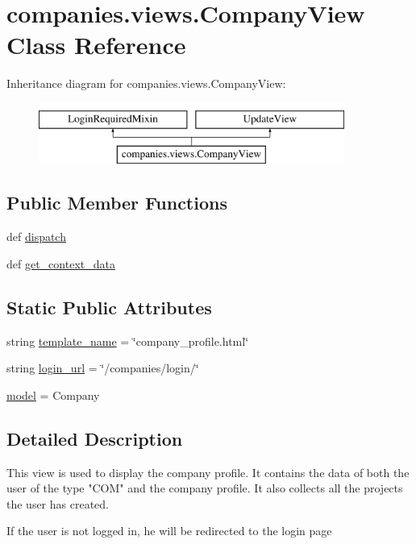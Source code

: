 \hypertarget{classcompanies_1_1views_1_1_company_view}{\section{companies.\-views.\-Company\-View Class Reference}
\label{classcompanies_1_1views_1_1_company_view}
}
Inheritance diagram for companies.\-views.\-Company\-View\-:\begin{figure}[H]
\begin{center}
\leavevmode
\includegraphics[height=2.000000cm]{classcompanies_1_1views_1_1_company_view}
\end{center}
\end{figure}
\subsection*{Public Member Functions}
\begin{DoxyCompactItemize}
\item 
def \hyperlink{classcompanies_1_1views_1_1_company_view_aaa790c7d15765cbc91d995fee5607041}{dispatch}
\item 
def \hyperlink{classcompanies_1_1views_1_1_company_view_a9bfc8f5e9d4cbfe993bac9298702ea8f}{get\-\_\-context\-\_\-data}
\end{DoxyCompactItemize}
\subsection*{Static Public Attributes}
\begin{DoxyCompactItemize}
\item 
string \hyperlink{classcompanies_1_1views_1_1_company_view_ac643f3eda9528b8985b7d9f2308f9c18}{template\-\_\-name} = \char`\"{}company\-\_\-profile.\-html\char`\"{}
\item 
string \hyperlink{classcompanies_1_1views_1_1_company_view_a67a131b471d1f3d6e1748eadfb41812f}{login\-\_\-url} = \char`\"{}/companies/login/\char`\"{}
\item 
\hyperlink{classcompanies_1_1views_1_1_company_view_a3e9e25180bcbb4b0f69f6a40a937d553}{model} = Company
\end{DoxyCompactItemize}


\subsection{Detailed Description}
\begin{DoxyVerb}This view is used to display the company profile.
It contains the data of both the user of the type "COM" and the company profile.
It also collects all the projects the user has created.

If the user is not logged in, he will be redirected to the login page
\end{DoxyVerb}
 

